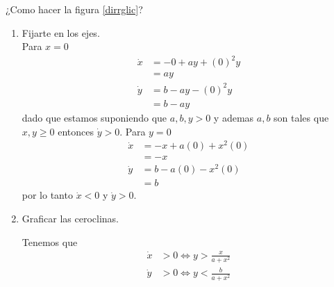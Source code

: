 \begin{tcolorbox}[colback=Black!4, colframe=White, arc = 2mm]
¿Como hacer la figura \ref{dirrglic}?
\begin{enumerate}
  \item Fijarte en los ejes. \\ 
  Para $x=0$
  \begin{align*}
    \dot{x}  &= -0 + ay + (0)^2y \\ 
	     &= ay \\ 
    \dot{y}&= b-ay-(0)^2y \\ 
	   &= b-ay
  \end{align*}
  dado que estamos suponiendo que $a,b,y>0$ y ademas $a,b$ son tales que $x,y \ge  0$ entonces $\dot{y}>0.$
  Para $y=0$
  \begin{align*}
    \dot{x} &= -x+a(0)+x^2(0) \\ 
	    &= -x \\ 
    \dot{y} &= b-a(0)-x^2(0) \\ 
     &= b 
  \end{align*}
  por lo tanto $\dot{x}<0$ y $\dot{y}>0.$
  \item Graficar las ceroclinas.

    Tenemos que
    \begin{align*}
      \dot{x} &> 0 \iff y > \frac{x}{a+x^2}\\  
      \dot{y} &> 0 \iff y < \frac{b}{a+x^2}
    \end{align*}
\end{enumerate}

\end{tcolorbox}

